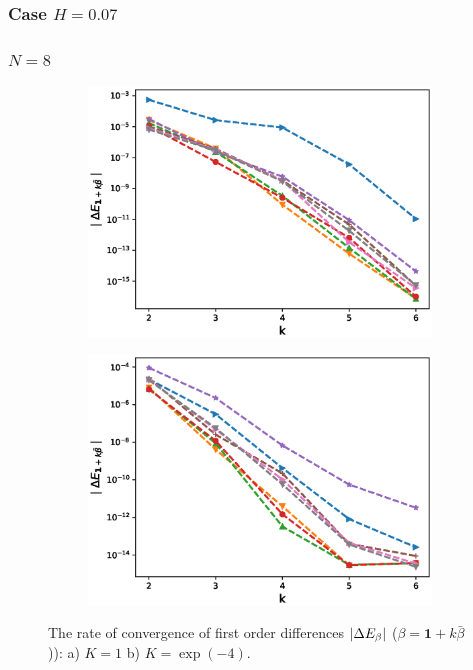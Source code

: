 \documentclass[11pt]{article}
\begin{document}
\newpage
\subsubsection*{Case $H=0.07$}
\subsubsection*{$N=8$ }

\begin{figure}[h!]
\centering
\begin{subfigure}{.5\textwidth}
\centering
\includegraphics[width=1\linewidth]{./figures/mixed_diff_second_way/H_007/N_8/first_difference_rbergomi_8steps_H_007_K_1.eps}
\caption{}
\label{fig:sub3}
\end{subfigure}%
\begin{subfigure}{.5\textwidth}
\centering
\includegraphics[width=1\linewidth]{./figures/mixed_diff_second_way/H_007/N_8/first_difference_rbergomi_8steps_H_007_K_exp__4.eps}
\caption{}
\label{fig:sub4}
\end{subfigure}

\caption{The rate of convergence of  first order differences $\left\lvert\Delta E_{\beta}\right\rvert$ ($\beta=\mathbf{1}+k \bar{\beta}$)): a) $K=1$ b)  $K=\operatorname{exp}(-4).$}
\label{fig:test2}
\end{figure}
\end{document}
